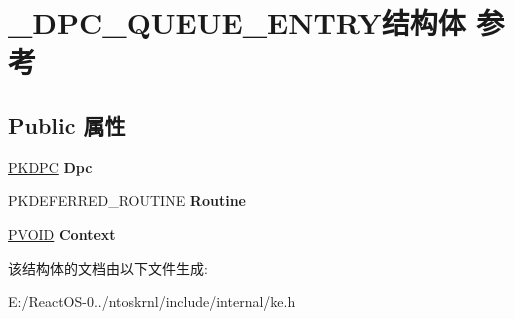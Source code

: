 \hypertarget{struct___d_p_c___q_u_e_u_e___e_n_t_r_y}{}\section{\+\_\+\+D\+P\+C\+\_\+\+Q\+U\+E\+U\+E\+\_\+\+E\+N\+T\+R\+Y结构体 参考}
\label{struct___d_p_c___q_u_e_u_e___e_n_t_r_y}
\subsection*{Public 属性}
\begin{DoxyCompactItemize}
\item 
\mbox{\label{struct___d_p_c___q_u_e_u_e___e_n_t_r_y_afcdfe3a43f823ae7eb0b5b3bd7a8c9c2}} 
\hyperlink{struct___k_d_p_c}{P\+K\+D\+PC} {\bfseries Dpc}
\item 
\mbox{\label{struct___d_p_c___q_u_e_u_e___e_n_t_r_y_a51ac11f35971be721d20a7c56bce3765}} 
P\+K\+D\+E\+F\+E\+R\+R\+E\+D\+\_\+\+R\+O\+U\+T\+I\+NE {\bfseries Routine}
\item 
\mbox{\label{struct___d_p_c___q_u_e_u_e___e_n_t_r_y_a2429a6a5ecc06a0b63e08d563506ebad}} 
\hyperlink{interfacevoid}{P\+V\+O\+ID} {\bfseries Context}
\end{DoxyCompactItemize}


该结构体的文档由以下文件生成\+:\begin{DoxyCompactItemize}
\item 
E\+:/\+React\+O\+S-\/0../ntoskrnl/include/internal/ke.\+h\end{DoxyCompactItemize}
